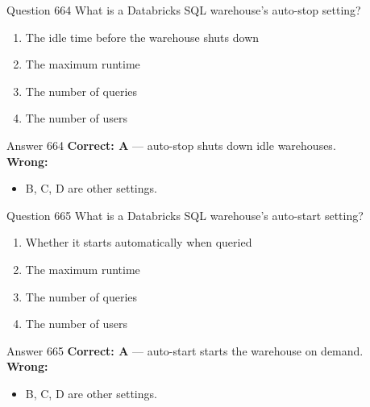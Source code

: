 \documentclass[aspectratio=169,11pt]{beamer}
\begin{document}
	\begin{frame}{Question 664}
		What is a Databricks SQL warehouse's auto-stop setting?
		\begin{enumerate}[label=\Alph*.]
			\item The idle time before the warehouse shuts down
			\item The maximum runtime
			\item The number of queries
			\item The number of users
		\end{enumerate}
	\end{frame}
	\begin{frame}{Answer 664}
		\textbf{Correct: A} --- auto-stop shuts down idle warehouses.\\
		\vspace{0.5em}
		\textbf{Wrong:}
		\begin{itemize}
			\item B, C, D are other settings.
		\end{itemize}
	\end{frame}
	
	\begin{frame}{Question 665}
		What is a Databricks SQL warehouse's auto-start setting?
		\begin{enumerate}[label=\Alph*.]
			\item Whether it starts automatically when queried
			\item The maximum runtime
			\item The number of queries
			\item The number of users
		\end{enumerate}
	\end{frame}
	\begin{frame}{Answer 665}
		\textbf{Correct: A} --- auto-start starts the warehouse on demand.\\
		\vspace{0.5em}
		\textbf{Wrong:}
		\begin{itemize}
			\item B, C, D are other settings.
		\end{itemize}
	\end{frame}
	
\end{document}
